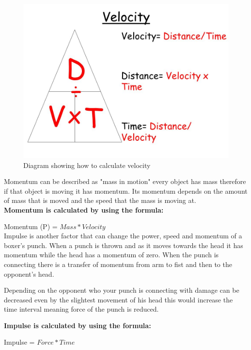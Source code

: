 \documentclass[a4paper,12pt]{report}
\begin{document}
 \begin{figure}[h]
    \begin{center}
    \includegraphics[scale=.3]{images/Velocity.jpeg}
    \caption{Diagram showing how to calculate velocity}
    \label{fig:velocity}
    \end{center}
\end{figure}

Momentum can be described as "mass in motion" every object has mass therefore if that object is moving it has momentum. Its momentum depends on the amount of mass that is moved and the speed that the mass is moving at.\\

\textbf{Momentum is calculated by using the formula:}

Momentum (P) = $Mass * Velocity$\\

Impulse is another factor that can change the power, speed and momentum of a boxer's punch. When a punch is thrown and as it moves towards the head it has momentum while the head has a momentum of zero. When the punch is connecting there is a transfer of momentum from arm to fist and then to the opponent's head.

Depending on the opponent who your punch is connecting with damage can be decreased even by the slightest movement of his head this would increase the time interval meaning force of the punch is reduced.\cite{boxingPhysics}

\textbf{Impulse is calculated by using the formula:}

Impulse = $Force * Time$ \\
\end{document}
